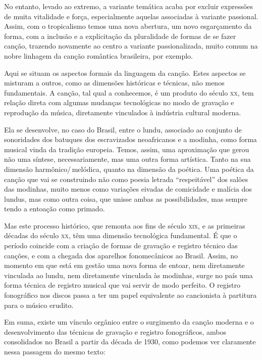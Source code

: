 No entanto, levado ao extremo, a variante temática acaba por excluir
expressões de muita vitalidade e força, especialmente aquelas associadas
à variante passional. Assim, com o tropicalismo temos uma nova abertura,
um novo esgarçamento da forma, com a inclusão e a explicitação da
pluralidade de formas de se fazer canção, trazendo novamente ao centro a
variante passionalizada, muito comum na nobre linhagem da canção
romântica brasileira, por exemplo.

Aqui se situam os aspectos formais da linguagem da canção. Estes
aspectos se misturam a outros, como as dimensões históricas e técnicas,
não menos fundamentais. A canção, tal qual a conhecemos, é um produto do
século \textsc{xx}, tem relação direta com algumas mudanças tecnológicas no modo
de gravação e reprodução da música, diretamente vinculados à indústria
cultural moderna.

Ela se desenvolve, no caso do Brasil, entre o lundu, associado ao
conjunto de sonoridades dos batuques dos escravizados neoafricanos e a
modinha, como forma musical vinda da tradição europeia. Temos, assim,
uma aproximação que gerou não uma síntese, necessariamente, mas uma
outra forma artística. Tanto na sua dimensão harmônico/\,melódica, quanto
na dimensão da poética. Uma poética da canção que vai se construindo não
como poesia letrada ``respeitável'' dos salões das modinhas, muito menos
como variações eivadas de comicidade e malícia dos lundus, mas como
outra coisa, que unisse ambas as possibilidades, mas sempre tendo a
entoação como primado.

Mas este processo histórico, que remonta aos fins de século \textsc{xix}, e as
primeiras décadas do século \textsc{xx}, têm uma dimensão tecnológica
fundamental. É que o período coincide com a criação de formas de
gravação e registro técnico das canções, e com a chegada dos aparelhos
fonomecânicos ao Brasil. Assim, no momento em que está em gestão uma
nova forma de entoar, nem diretamente vinculada ao lundu, nem
diretamente vinculada às modinhas, surge no país uma forma técnica de
registro musical que vai servir de modo perfeito. O registro fonográfico
nos discos passa a ter um papel equivalente ao cancionista à partitura
para o músico erudito.

Em suma, existe um vínculo orgânico entre o surgimento da canção moderna
e o desenvolvimento das técnicas de gravação e registro fonográficos,
ambos consolidados no Brasil a partir da década de 1930, como podemos ver
claramente nessa passagem do mesmo texto:

